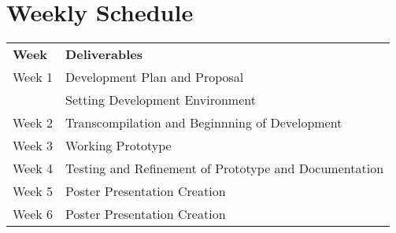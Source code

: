 \documentclass{article}
\begin{document}
\section{Weekly Schedule} %

\begin{center}
\begin{tabular}{ l | l }
  \textbf{Week} & \textbf{Deliverables} \\
  \hhline{=|=}
  Week 1 & Development Plan and Proposal\\
         & Setting Development Environment\\ 
  Week 2 & Transcompilation and Beginnning of Development\\
  Week 3 & Working Prototype\\
  Week 4 & Testing and Refinement of Prototype and Documentation\\
  Week 5 & Poster Presentation Creation\\
  Week 6 & Poster Presentation Creation\\
\end{tabular}
\end{center}

\end{document}
